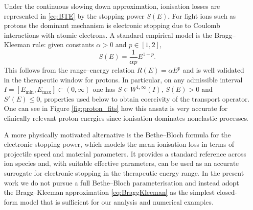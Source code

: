 \documentclass[final]{amsart}
\begin{document}
Under the continuous slowing down approximation, ionisation losses are
represented in \eqref{eq:BTE} by the stopping power $S(E)$. For light
ions such as protons the dominant mechanism is electronic stopping due
to Coulomb interactions with atomic electrons. A standard empirical
model is the Bragg--Kleeman rule: given constants $\alpha>0$ and
$p\in[1,2]$,
\begin{equation}\label{eq:BraggKleeman}
  S(E)  =  \frac{1}{\alpha p} E^{1-p}.
\end{equation}
This follows from the range--energy relation $R(E)=\alpha E^p$ and is
well validated in the therapeutic window for protons. In particular,
on any admissible interval $I=[E_{\min},E_{\max}] \subset (0,\infty)$
one has $S\in W^{1,\infty}(I)$, $S(E)>0$ and $S'(E)\le 0$, properties
used below to obtain coercivity of the transport operator. One can see
in Figure \ref{fig:proton_fits} how this ansatz is very accurate for
clinically relevant proton energies since ionisation dominates
nonelastic processes.

A more physically motivated alternative is the Bethe--Bloch formula for
the electronic stopping power, which models the mean ionisation loss in
terms of projectile speed and material parameters. It provides a
standard reference across ion species and, with suitable effective
parameters, can be used as an accurate surrogate for electronic
stopping in the therapeutic energy range. In the present work we do not
pursue a full Bethe--Bloch parameterisation and instead adopt the
Bragg--Kleeman approximation \eqref{eq:BraggKleeman} as the simplest
closed-form model that is sufficient for our analysis and numerical
examples.
\end{document}
